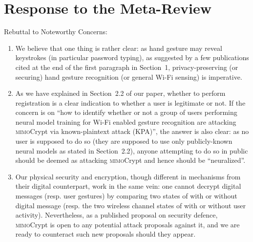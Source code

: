 \documentclass[conference,compsoc]{IEEEtran}
\newcommand{\sname}{\textsc{mimo}Crypt\xspace}
\begin{document}
\section*{Response to the Meta-Review} %
%
\noindent Rebuttal to Noteworthy Concerns:
%
\vspace{1ex}
\begin{enumerate} 
\item We believe that one thing is rather clear: as hand gesture may reveal keystrokes (in particular password typing), as suggested by a few publications cited at the end of the first paragraph in Section~1, privacy-preserving (or securing) hand gesture recognition (or general Wi-Fi sensing) is imperative.
\vspace{1ex}
\item As we have explained in Section~2.2 of our paper, whether to perform registration is a clear indication to whether a user is legitimate or not. If the concern is on ``how to identify whether or not a group of users performing neural model training for Wi-Fi enabled gesture recognition are attacking \sname via known-plaintext attack (KPA)'', the answer is also clear: as no user is supposed to do so (they are supposed to use only publicly-known neural models as stated in Section~2.2), anyone attempting to do so in public should be deemed as attacking \sname and hence should be ``neuralized''.
\vspace{1ex}
\item Our physical security and encryption, though different in mechanisms from their digital counterpart, work in the same vein: one cannot decrypt digital messages (resp. user gestures) by comparing two states of with or without digital message (resp. the two wireless channel states of with or without user activity). Nevertheless, as a published proposal on security defence, \sname is open to any potential attack proposals against it, and we are ready to counteract such new proposals should they appear.
\end{enumerate}


\end{document}
